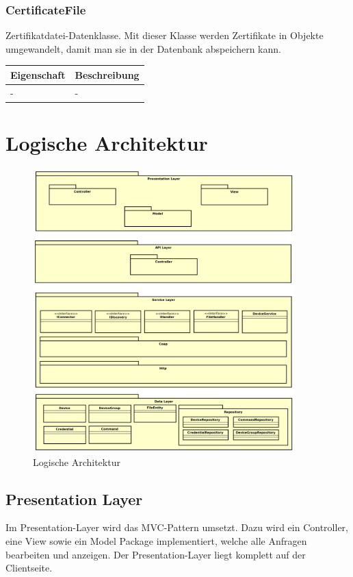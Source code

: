\subsubsection{CertificateFile}
Zertifikatdatei-Datenklasse. Mit dieser Klasse werden Zertifikate in Objekte umgewandelt, damit man sie in der Datenbank abspeichern kann.
\begin{table}[H]
\centering
    \begin{tabular}{@{}l p{14.1cm} @{}}\toprule    
    {Eigenschaft} & {Beschreibung}\\ \midrule      
    - & -\\
    \bottomrule
    \end{tabular}
\end{table}


\section{Logische Architektur}
\begin{figure} [H]
	\begin{center}
	\includegraphics[width=0.90\textwidth]{images/architektur.png}
	\caption{Logische Architektur}
	\end{center}
\end{figure}


\subsection{Presentation Layer}
Im Presentation-Layer wird das MVC-Pattern umsetzt. Dazu wird ein Controller, eine View sowie ein Model Package implementiert, welche alle Anfragen bearbeiten und anzeigen. Der Presentation-Layer liegt komplett auf der Clientseite.
